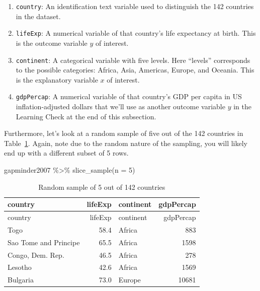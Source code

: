\documentclass[
  letterpaper,
  DIV=11,
  numbers=noendperiod]{scrreprt}
\newenvironment{Shaded}{\begin{snugshade}}{\end{snugshade}}
\newcommand{\AttributeTok}[1]{\textcolor[rgb]{0.40,0.45,0.13}{#1}}
\newcommand{\DecValTok}[1]{\textcolor[rgb]{0.68,0.00,0.00}{#1}}
\newcommand{\FunctionTok}[1]{\textcolor[rgb]{0.28,0.35,0.67}{#1}}
\newcommand{\NormalTok}[1]{\textcolor[rgb]{0.00,0.23,0.31}{#1}}
\newcommand{\SpecialCharTok}[1]{\textcolor[rgb]{0.37,0.37,0.37}{#1}}
\theoremstyle{definition}
\theoremstyle{remark}
\begin{document}
\begin{enumerate}
\def\labelenumi{\arabic{enumi}.}
\item
  \texttt{country}: An identification text variable used to distinguish
  the 142 countries in the dataset.
\item
  \texttt{lifeExp}: A numerical variable of that country's life
  expectancy at birth. This is the outcome variable \(y\) of interest.
\item
  \texttt{continent}: A categorical variable with five levels. Here
  ``levels'' corresponds to the possible categories: Africa, Asia,
  Americas, Europe, and Oceania. This is the explanatory variable \(x\)
  of interest.
\item
  \texttt{gdpPercap}: A numerical variable of that country's GDP per
  capita in US inflation-adjusted dollars that we'll use as another
  outcome variable \(y\) in the Learning Check at the end of this
  subsection.
\end{enumerate}

Furthermore, let's look at a random sample of five out of the 142
countries in Table~\ref{tbl-model2-data-preview}. Again, note due to the
random nature of the sampling, you will likely end up with a different
subset of 5 rows.

\begin{Shaded}
\begin{Highlighting}[]
\NormalTok{gapminder2007 }\SpecialCharTok{\%\textgreater{}\%}
  \FunctionTok{slice\_sample}\NormalTok{(}\AttributeTok{n =} \DecValTok{5}\NormalTok{)}
\end{Highlighting}
\end{Shaded}

\hypertarget{tbl-model2-data-preview}{}
\begin{longtable}[]{@{}lrlr@{}}
\caption{\label{tbl-model2-data-preview}Random sample of 5 out of 142
countries}\tabularnewline
\toprule()
country & lifeExp & continent & gdpPercap \\
\midrule()
\endfirsthead
\toprule()
country & lifeExp & continent & gdpPercap \\
\midrule()
\endhead
Togo & 58.4 & Africa & 883 \\
Sao Tome and Principe & 65.5 & Africa & 1598 \\
Congo, Dem. Rep. & 46.5 & Africa & 278 \\
Lesotho & 42.6 & Africa & 1569 \\
Bulgaria & 73.0 & Europe & 10681 \\
\bottomrule()
\end{longtable}
\end{document}
